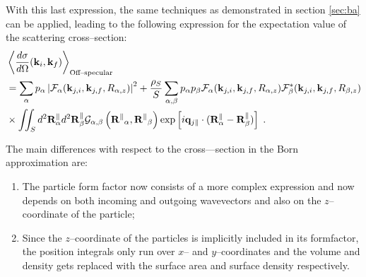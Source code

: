 With this last expression, the same techniques as demonstrated in section \ref{sec:ba} can be applied, leading to the following expression for the expectation value of the scattering cross--section:
\begin{align*}
  & \left\langle \frac{d\sigma}{d\Omega}(\mathbf{k}_i,\mathbf{k}_f) \right\rangle_{\text{Off--specular}}  \\
  & = \sum_\alpha p_\alpha \left\lvert \mathcal{F}_\alpha(\mathbf{k}_{j,i},\mathbf{k}_{j,f}, R_{\alpha,z})\right\rvert ^2 + \frac{\rho_S}{S}\sum_{\alpha,\beta} p_\alpha p_\beta \mathcal{F}_\alpha (\mathbf{k}_{j,i},\mathbf{k}_{j,f}, R_{\alpha,z})\mathcal{F}_\beta^*(\mathbf{k}_{j,i},\mathbf{k}_{j,f}, R_{\beta,z}) \\
  & \times \iint_S d^2\mathbf{R}_\alpha^\parallel d^2\mathbf{R}_\beta^\parallel \mathcal{G}_{\alpha ,\beta}\left( \mathbf{R^\parallel}_{\alpha} , \mathbf{R^\parallel}_{\beta} \right) \exp \left[ i\mathbf{q}_{j\parallel}\cdot (\mathbf{R}_\alpha^\parallel - \mathbf{R}_\beta^\parallel ) \right] \; .
\end{align*}

The main differences with respect to the cross---section in the Born approximation are:
\begin{enumerate}
  \item The particle form factor now consists of a more complex expression and now depends on both incoming and outgoing wavevectors and also on the $z$--coordinate of the particle;
  \item Since the $z$--coordinate of the particles is implicitly included in its formfactor, the position integrals only run over $x$-- and $y$--coordinates and the volume and density gets replaced with the surface area and surface density respectively.
\end{enumerate}

